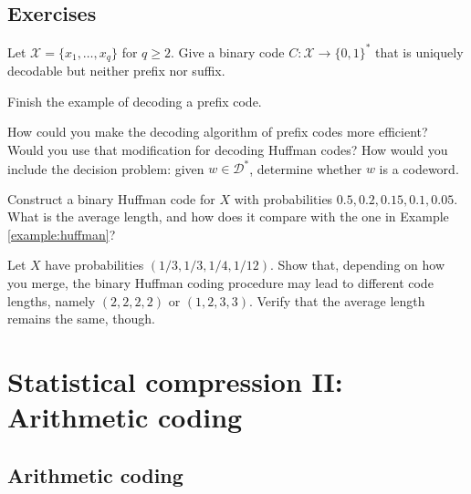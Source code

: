 \documentclass[a4paper, 11pt, openany]{book}
\begin{document}
\subsection{Exercises}

\begin{exercise} \label{exercise:not_prefix}
Let $\mathcal{X} = \{x_1, \dots, x_q\}$ for $q \ge 2$. Give a binary code $C : \mathcal{X} \to \{0,1\}^*$ that is uniquely decodable but neither prefix nor suffix.
\end{exercise}

\begin{exercise} \label{exercise:prefix}
Finish the example of decoding a prefix code.
\end{exercise}

\begin{exercise} \label{exercise:decoding_prefix}
How could you make the decoding algorithm of prefix codes more efficient? Would you use that modification for decoding Huffman codes? How would you include the decision problem: given $w \in \mathcal{D}^*$, determine whether $w$ is a codeword.
\end{exercise}

\begin{exercise} \label{exercise:huffman}
Construct a binary Huffman code for $X$ with probabilities $0.5, 0.2, 0.15, 0.1, 0.05$. What is the average length, and how does it compare with the one in Example \ref{example:huffman}?
\end{exercise}

\begin{exercise} \label{exercise:huffman_unequal_lengths}
Let $X$ have probabilities $(1/3, 1/3, 1/4, 1/{12})$. Show that, depending on how you merge, the binary Huffman coding procedure may lead to different code lengths, namely $(2,2,2,2)$ or $(1,2,3,3)$. Verify that the average length remains the same, though.
\end{exercise}

\section{Statistical compression II: Arithmetic coding}
\label{sec:02}



\subsection{Arithmetic coding}
\end{document}
